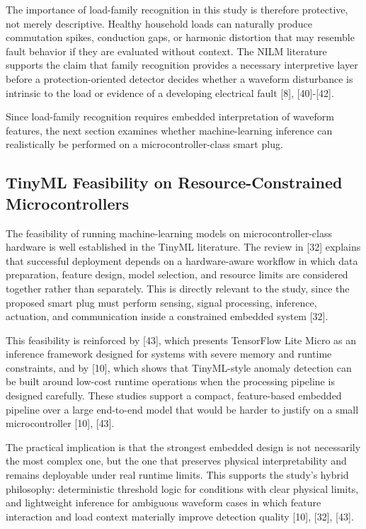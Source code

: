 The importance of load-family recognition in this study is therefore
protective, not merely descriptive. Healthy household loads can
naturally produce commutation spikes, conduction gaps, or harmonic
distortion that may resemble fault behavior if they are evaluated
without context. The NILM literature supports the claim that family
recognition provides a necessary interpretive layer before a
protection-oriented detector decides whether a waveform disturbance is
intrinsic to the load or evidence of a developing electrical fault
{[}8{]}, {[}40{]}-{[}42{]}.

Since load-family recognition requires embedded interpretation of
waveform features, the next section examines whether machine-learning
inference can realistically be performed on a microcontroller-class
smart plug.

\subsection{TinyML Feasibility on Resource-Constrained Microcontrollers}\label{tinyml-feasibility-on-resource-constrained-microcontrollers}

The feasibility of running machine-learning models on
microcontroller-class hardware is well established in the TinyML
literature. The review in {[}32{]} explains that successful deployment
depends on a hardware-aware workflow in which data preparation, feature
design, model selection, and resource limits are considered together
rather than separately. This is directly relevant to the study, since
the proposed smart plug must perform sensing, signal processing,
inference, actuation, and communication inside a constrained embedded
system {[}32{]}.

This feasibility is reinforced by {[}43{]}, which presents TensorFlow
Lite Micro as an inference framework designed for systems with severe
memory and runtime constraints, and by {[}10{]}, which shows that
TinyML-style anomaly detection can be built around low-cost runtime
operations when the processing pipeline is designed carefully. These
studies support a compact, feature-based embedded pipeline over a large
end-to-end model that would be harder to justify on a small
microcontroller {[}10{]}, {[}43{]}.

The practical implication is that the strongest embedded design is not
necessarily the most complex one, but the one that preserves physical
interpretability and remains deployable under real runtime limits. This
supports the study's hybrid philosophy: deterministic threshold logic
for conditions with clear physical limits, and lightweight inference for
ambiguous waveform cases in which feature interaction and load context
materially improve detection quality {[}10{]}, {[}32{]}, {[}43{]}.

